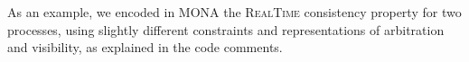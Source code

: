\documentclass[12pt]{article}
\begin{document}
%
%
%
%
%
%
%



As an example, we encoded in MONA the \textsc{RealTime} consistency property for two processes, using slightly different constraints and representations of arbitration and visibility, as explained in the code comments.
\end{document}
